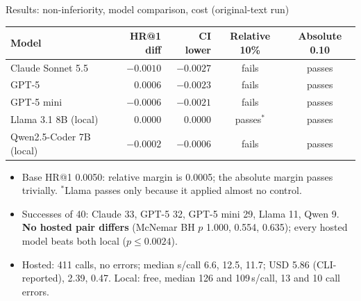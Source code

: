 \documentclass[10pt]{beamer}
\newcommand{\toprule}{\hline}
\newcommand{\midrule}{\hline}
\newcommand{\bottomrule}{\hline}
\begin{document}
\begin{frame}{Results: non-inferiority, model comparison, cost (original-text run)}
\scriptsize
\begin{tabular}{@{}lrrcc@{}}
\toprule
Model & HR@1 diff & CI lower & Relative 10\% & Absolute 0.10\\\midrule
Claude Sonnet 5.5 & $-0.0010$ & $-0.0027$ & fails & passes\\
GPT-5 & $0.0006$ & $-0.0023$ & fails & passes\\
GPT-5 mini & $-0.0006$ & $-0.0021$ & fails & passes\\
Llama 3.1 8B (local) & $0.0000$ & $0.0000$ & passes$^{*}$ & passes\\
Qwen2.5-Coder 7B (local) & $-0.0002$ & $-0.0006$ & fails & passes\\
\bottomrule
\end{tabular}\par
\vspace{0.2cm}
\begin{itemize}
\item Base HR@1 0.0050: relative margin is 0.0005; the absolute margin passes trivially. $^{*}$Llama passes only because it applied almost no control.
\item Successes of 40: Claude 33, GPT-5 32, GPT-5 mini 29, Llama 11, Qwen 9. \textbf{No hosted pair differs} (McNemar BH $p$ 1.000, 0.554, 0.635); every hosted model beats both local ($p\leq0.0024$).
\item Hosted: 411 calls, no errors; median s/call 6.6, 12.5, 11.7; USD 5.86 (CLI-reported), 2.39, 0.47. Local: free, median 126 and 109\,s/call, 13 and 10 call errors.
\end{itemize}
\end{frame}
\end{document}
